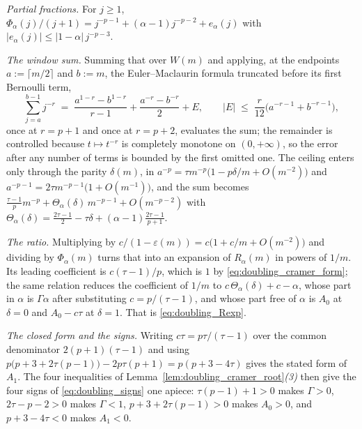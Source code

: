 \emph{Partial fractions.} For $j\geq1$, $\Phi_\alpha(j)/(j+1)=j^{-p-1}+(\alpha-1)j^{-p-2}+
e_\alpha(j)$ with $|e_\alpha(j)|\leq|1-\alpha|\,j^{-p-3}$.

\emph{The window sum.} Summing that over $W(m)$ and applying, at the endpoints
$a:=\lceil m/2\rceil$ and $b:=m$, the Euler--Maclaurin formula truncated before its first
Bernoulli term,
\begin{equation}\label{eq:doubling_em}
    \sum_{j=a}^{b-1}j^{-r}\;=\;\frac{a^{1-r}-b^{1-r}}{r-1}+\frac{a^{-r}-b^{-r}}{2}+E,
    \qquad |E|\;\leq\;\frac{r}{12}\bigl(a^{-r-1}+b^{-r-1}\bigr),
\end{equation}
once at $r=p+1$ and once at $r=p+2$, evaluates the sum; the remainder is controlled because
$t\mapsto t^{-r}$ is completely monotone on $(0,+\infty)$, so the error after any number of
terms is bounded by the first omitted one. The ceiling enters only through the parity $\delta(m)$, in
$a^{-p}=\tau m^{-p}\bigl(1-p\delta/m+O(m^{-2})\bigr)$ and
$a^{-p-1}=2\tau m^{-p-1}\bigl(1+O(m^{-1})\bigr)$, and the sum becomes
$\frac{\tau-1}{p}m^{-p}+\Theta_\alpha(\delta)\,m^{-p-1}+O(m^{-p-2})$ with
$\Theta_\alpha(\delta)=\frac{2\tau-1}{2}-\tau\delta+(\alpha-1)\frac{2\tau-1}{p+1}$.

\emph{The ratio.} Multiplying by $c/(1-\varepsilon(m))=c\bigl(1+c/m+O(m^{-2})\bigr)$ and
dividing by $\Phi_\alpha(m)$ turns that into an expansion of $R_\alpha(m)$ in powers of
$1/m$. Its leading coefficient is
$c(\tau-1)/p$, which is $1$ by \eqref{eq:doubling_cramer_form}; the same relation reduces the
coefficient of $1/m$ to $c\,\Theta_\alpha(\delta)+c-\alpha$, whose part in $\alpha$ is
$\Gamma\alpha$ after substituting $c=p/(\tau-1)$, and whose part free of $\alpha$ is $A_0$ at
$\delta=0$ and $A_0-c\tau$ at $\delta=1$. That is \eqref{eq:doubling_Rexp}.

\emph{The closed form and the signs.} Writing $c\tau=p\tau/(\tau-1)$ over the common
denominator $2(p+1)(\tau-1)$ and using
$p\bigl(p+3+2\tau(p-1)\bigr)-2p\tau(p+1)=p(p+3-4\tau)$ gives the stated form of $A_1$. The
four inequalities of Lemma~\ref{lem:doubling_cramer_root}\emph{(3)} then give the four signs
of \eqref{eq:doubling_signs} one apiece: $\tau(p-1)+1>0$ makes $\Gamma>0$, $2\tau-p-2>0$ makes
$\Gamma<1$, $p+3+2\tau(p-1)>0$ makes $A_0>0$, and $p+3-4\tau<0$ makes $A_1<0$.
